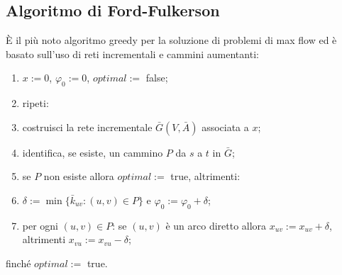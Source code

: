 \subsection{Algoritmo di Ford-Fulkerson}
È il più noto algoritmo greedy per la soluzione di problemi di max flow ed è basato sull'uso di reti incrementali e cammini aumentanti:
\begin{enumerate}
	\item $x:=0$, $\varphi_0:=0$, $optimal:=$ false;
	\item ripeti:
	\item costruisci la rete incrementale $\bar{G}(V,\bar{A})$ associata a $x$;
	\item identifica, se esiste, un cammino $P$ da $s$ a $t$ in $\bar{G}$;
	\item se $P$ non esiste allora $optimal:=$ true, altrimenti:
	\item $\delta:=\min\{\bar{k}_{uv}:(u,v)\in P\}$ e $\varphi_0:=\varphi_0+\delta$;
	\item per ogni $(u,v)\in P$: se $(u,v)$ è un arco diretto allora $x_{uv}:=x_{uv}+\delta$, altrimenti $x_{vu}:=x_{vu}-\delta$;
\end{enumerate}
finché $optimal:=$ true.

